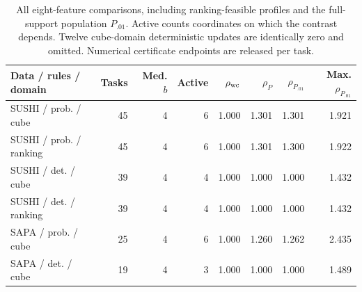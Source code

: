 \begin{table}[t]
\centering
\caption{All eight-feature comparisons, including ranking-feasible profiles and the full-support population $P_{.01}$. Active counts coordinates on which the contrast depends. Twelve cube-domain deterministic updates are identically zero and omitted. Numerical certificate endpoints are released per task.}
\label{tab:mediumdetail}
\small
\setlength{\tabcolsep}{4pt}
\begin{tabular}{lrrrrrrr}
\toprule
Data / rules / domain & Tasks & Med. $b$ & Active & $\rho_{\rm wc}$ & $\rho_P$ & $\rho_{P_{.01}}$ & Max. $\rho_{P_{.01}}$ \\
\midrule
SUSHI / prob. / cube & 45 & 4 & 6 & 1.000 & 1.301 & 1.301 & 1.921 \\
SUSHI / prob. / ranking & 45 & 4 & 6 & 1.000 & 1.301 & 1.300 & 1.922 \\
SUSHI / det. / cube & 39 & 4 & 4 & 1.000 & 1.000 & 1.000 & 1.432 \\
SUSHI / det. / ranking & 39 & 4 & 4 & 1.000 & 1.000 & 1.000 & 1.432 \\
SAPA / prob. / cube & 25 & 4 & 6 & 1.000 & 1.260 & 1.262 & 2.435 \\
SAPA / det. / cube & 19 & 4 & 3 & 1.000 & 1.000 & 1.000 & 1.489 \\
\bottomrule
\end{tabular}
\end{table}

